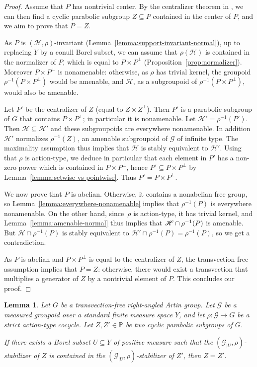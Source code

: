 \documentclass[JEP,XML,SOM,Unicode,NoFloatCountersInSection,published]{cedram}
\let\mathcal\mathscr
\theoremstyle{plain}
\newtheorem{lemma}[theo]{Lemma}
\theoremstyle{definition}
\newcommand{\calg}{\mathcal{G}}
\newcommand{\calh}{\mathcal{H}}
\begin{document}
\begin{proof}
Assume that $P$ has nontrivial center. By the centralizer theorem in \cite{Ser}, we can then find a cyclic parabolic subgroup $Z\subseteq P$ contained in the center of $P$, and we aim to prove that $P=Z$.

As $P$ is $(\calh,\rho)$-invariant (Lemma~\ref{lemma:support-invariant-normal}), up to replacing $Y$ by a conull Borel subset, we can assume that $\rho(\calh)$ is contained in the normalizer of $P$, which is equal to $P\times P^{\perp}$ (Proposition~\ref{prop:normalizer}). Moreover $P\times P^{\perp}$ is nonamenable: otherwise, as $\rho$ has trivial kernel, the groupoid $\rho^{-1}(P\times P^{\perp})$ would be amenable, and $\calh$, as a subgroupoid of $\rho^{-1}(P\times P^{\perp})$, would also be amenable.

Let $P'$ be the centralizer of $Z$ (equal to $Z\times Z^{\perp}$). Then $P'$ is a parabolic subgroup of $G$ that contains $P\times P^\perp$; in particular it is nonamenable. Let $\calh'=\rho^{-1}(P')$. Then $\calh\subseteq\calh'$ and these subgroupoids are everywhere nonamenable. In addition $\calh'$ normalizes $\rho^{-1}(Z)$, an amenable subgroupoid of $\calg$ of infinite type. The maximality assumption thus implies that $\calh$ is stably equivalent to $\calh'$. Using that $\rho$ is action-type, we deduce in particular that each element in $P'$ has a non-zero power which is contained in $P\times P^\perp$, hence $P'\subseteq P\times P^{\perp}$ by Lemma~\ref{lemma:setwise vs pointwise}. Thus $P'=P\times P^\perp$.

We now prove that $P$ is abelian. Otherwise, it contains a nonabelian free group, so Lemma~\ref{lemma:everywhere-nonamenable} implies that $\rho^{-1}(P)$ is everywhere nonamenable. On the other hand, since~$\rho$ is action-type, it has trivial kernel, and Lemma~\ref{lemma:amenable-normal} thus implies that $\calh\cap\nobreak \rho^{-1}(P)$ is amenable. But $\calh\cap\rho^{-1}(P)$ is stably equivalent to $\calh'\cap\rho^{-1}(P)=\rho^{-1}(P)$, so we get a contradiction.

As $P$ is abelian and $P\times P^{\perp}$ is equal to the centralizer of $Z$, the transvection-free assumption implies that $P=Z$: otherwise, there would exist a transvection that multiplies a generator of $Z$ by a nontrivial element of $P$. This concludes our proof.
\end{proof}


\begin{lemma}\label{lemma:uniqueness}
Let $G$ be a transvection-free right-angled Artin group. Let $\calg$ be a measured groupoid over a standard finite measure space $Y$, and let $\rho:\calg\to G$ be a strict action-type cocycle. Let $Z,Z'\in\mathbb{P}$ be two cyclic parabolic subgroups of $G$.

If there exists a Borel subset $U\subseteq Y$ of positive measure such that the $(\calg_{|U},\rho)$-stabilizer of $Z$ is contained in the $(\calg_{|U},\rho)$-stabilizer of $Z'$, then $Z=Z'$.
\end{lemma}
\end{document}
